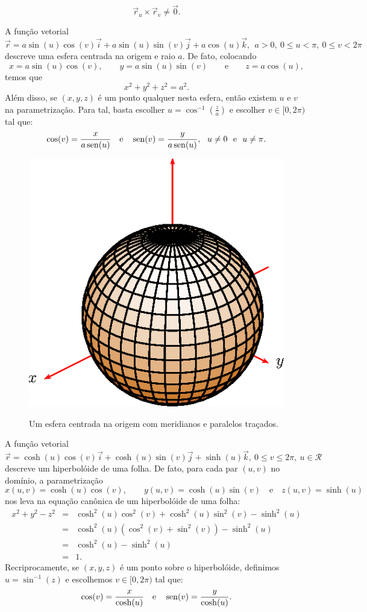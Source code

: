 $$
\vec{r}_u\times \vec{r}_v\neq \vec{0}.
$$
\begin{ex}A função vetorial
$$
\vec{r}=a\sin(u)\cos(v)\vec{i}+a\sin(u)\sin(v)\vec{j}+a\cos(u)\vec{k},~~ a>0, ~ 0\leq u< \pi, ~ 0\leq v< 2\pi
$$
descreve uma esfera centrada na origem e raio $a$. De fato, colocando $$x=a\sin(u)\cos(v),\qquad y=a\sin(u)\sin(v)\qquad\text{e}\qquad z=a\cos(u),$$
temos que
$$
x^2+y^2+z^2=a^2.
$$
Além disso, se $(x,y,z)$ é um ponto qualquer nesta esfera, então existem $u$ e $v$ na parametrização. Para tal, basta escolher $u=\cos^{-1}\left(\frac{z}{a}\right)$ e escolher $v\in[0,2\pi)$ tal que:
$$\cos(v)=\frac{x}{a\sin(u)} \quad \hbox{e} \quad \sin(v)=\frac{y}{a\sin(u)},~~u\neq 0 ~~ \hbox{e} ~~u\neq \pi.$$

 \begin{figure}%
\centering
 \includegraphics{cap_superficies/figs/figura_1}\label{cap_superficies_esfera}
\caption{Um esfera centrada na origem com meridianos e paralelos traçados.}
\end{figure}
\end{ex}

\begin{ex}A função vetorial
 $$
 \vec{r}=\cosh(u)\cos( v)\vec{i}+ \cosh(u)\sin(v)\vec{j}+\sinh(u)\vec{k},\ 0\leq v\leq 2\pi,\ u\in\mathcal{R}
 $$
 descreve um hiperbolóide de uma folha. De fato, para cada par $(u,v)$ no domínio, a parametrização
 $$
 x(u,v)=\cosh(u)\cos(v),\qquad y(u,v)=\cosh(u)\sin(v)\quad\text{e}\quad z(u,v)=\sinh(u)
 $$
 nos leva na equação canônica de um hiperbolóide de uma folha:
 \begin{eqnarray*}
 x^2+y^2-z^2&=&\cosh^2(u)\cos^2(v)+\cosh^2(u)\sin^2(v)-\sinh^2(u)  \\
 &=&\cosh^2(u)(\cos^2(v)+\sin^2(v))-\sinh^2(u)  \\
 &=&\cosh^2(u)-\sinh^2(u)  \\
 &=&1.
 \end{eqnarray*}
Recriprocamente, se $(x,y,z)$ é um ponto sobre o hiperbolóide, definimos $u=\sin^{-1}(z)$ e escolhemos $v\in[0,2\pi)$ tal que:
$$\cos(v)=\frac{x}{\cosh(u)} \quad \hbox{e} \quad \sin(v)=\frac{y}{\cosh(u)}.$$
 \end{ex}
 

